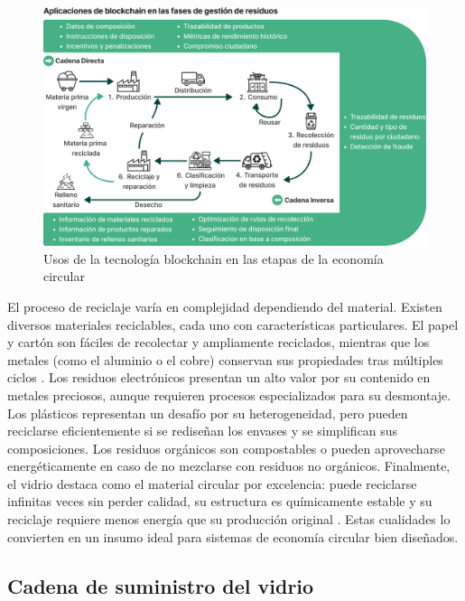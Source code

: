 \begin{figure}[!tb]
    \centering
    \includegraphics[width=\textwidth]{Figures/baralla-model-1.png}
    \caption[Usos de la tecnología \textit{blockchain} en la economía circular]{Usos de la tecnología blockchain en las etapas de la economía circular \cite{baralla2023waste}}
    \label{fig:baralla-model-1}
\end{figure}

El proceso de reciclaje varía en complejidad dependiendo del material. Existen diversos materiales reciclables, cada uno con características particulares. El papel y cartón son fáciles de recolectar y ampliamente reciclados, mientras que los metales (como el aluminio o el cobre) conservan sus propiedades tras múltiples ciclos \cite{cepal2021economia}. Los residuos electrónicos presentan un alto valor por su contenido en metales preciosos, aunque requieren procesos especializados para su desmontaje. Los plásticos representan un desafío por su heterogeneidad, pero pueden reciclarse eficientemente si se rediseñan los envases y se simplifican sus composiciones. Los residuos orgánicos son compostables o pueden aprovecharse energéticamente en caso de no mezclarse con residuos no orgánicos. Finalmente, el vidrio destaca como el material circular por excelencia: puede reciclarse infinitas veces sin perder calidad, su estructura es químicamente estable y su reciclaje requiere menos energía que su producción original \cite{verallia2022whitebook}. Estas cualidades lo convierten en un insumo ideal para sistemas de economía circular bien diseñados.

\subsection{Cadena de suministro del vidrio}
\label{sec:glass-supply-chain}

